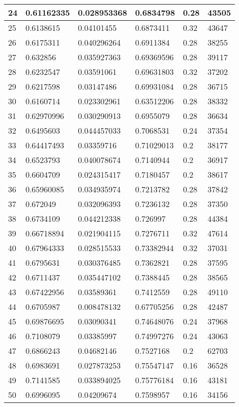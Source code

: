 \begin{longtable}{|l|l|l|l|l|l|}
24 & 0.61162335 & 0.028953368 & 0.6834798 & 0.28 & 43505 \\ \hline 
25 & 0.6138615 & 0.04101455 & 0.6873411 & 0.32 & 43647 \\ \hline 
26 & 0.6175311 & 0.040296264 & 0.6911384 & 0.28 & 38255 \\ \hline 
27 & 0.632856 & 0.035927363 & 0.69369596 & 0.28 & 39117 \\ \hline 
28 & 0.6232547 & 0.03591061 & 0.69631803 & 0.32 & 37202 \\ \hline 
29 & 0.6217598 & 0.03147486 & 0.69931084 & 0.28 & 36715 \\ \hline 
30 & 0.6160714 & 0.023302961 & 0.63512206 & 0.28 & 38332 \\ \hline 
31 & 0.62970996 & 0.030290913 & 0.6955079 & 0.28 & 36634 \\ \hline 
32 & 0.6495603 & 0.044457033 & 0.7068531 & 0.24 & 37354 \\ \hline 
33 & 0.64417493 & 0.03359716 & 0.71029013 & 0.2 & 38177 \\ \hline 
34 & 0.6523793 & 0.040078674 & 0.7140944 & 0.2 & 36917 \\ \hline 
35 & 0.6604709 & 0.024315417 & 0.7180457 & 0.2 & 38617 \\ \hline 
36 & 0.65960085 & 0.034935974 & 0.7213782 & 0.28 & 37842 \\ \hline 
37 & 0.672049 & 0.032096393 & 0.7236132 & 0.28 & 37350 \\ \hline 
38 & 0.6734109 & 0.044212338 & 0.726997 & 0.28 & 44384 \\ \hline 
39 & 0.66718894 & 0.021904115 & 0.7276711 & 0.32 & 47614 \\ \hline 
40 & 0.67964333 & 0.028515533 & 0.73382944 & 0.32 & 37031 \\ \hline 
41 & 0.6795631 & 0.030376485 & 0.7362821 & 0.28 & 37595 \\ \hline 
42 & 0.6711437 & 0.035447102 & 0.7388445 & 0.28 & 38565 \\ \hline 
43 & 0.67422956 & 0.03589361 & 0.7412559 & 0.28 & 49110 \\ \hline 
44 & 0.6705987 & 0.008478132 & 0.67705256 & 0.28 & 42487 \\ \hline 
45 & 0.69876695 & 0.03090341 & 0.74648076 & 0.24 & 37968 \\ \hline 
46 & 0.7108079 & 0.03385997 & 0.74997276 & 0.24 & 43063 \\ \hline 
47 & 0.6866243 & 0.04682146 & 0.7527168 & 0.2 & 62703 \\ \hline 
48 & 0.6983691 & 0.027873253 & 0.75547147 & 0.16 & 36528 \\ \hline 
49 & 0.7141585 & 0.033894025 & 0.75776184 & 0.16 & 43181 \\ \hline 
50 & 0.6996095 & 0.04209674 & 0.7598957 & 0.16 & 34156 \\ \hline 
\end{longtable}